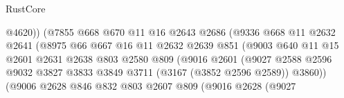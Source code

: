 \begin{lexlean}{RustCore}
\begin{coremodule}
                                        @4620))
                                    (@7855
                                      @668
                                      @670
                                      @11
                                      @16
                                      @2643
                                      @2686
                                      (@9336
                                        @668
                                        @11
                                        @2632
                                        @2641
                                        (@8975
                                          @66
                                          @667
                                          @16
                                          @11
                                          @2632
                                          @2639
                                          @851
                                          (@9003
                                            @640
                                            @11
                                            @15
                                            @2601
                                            @2631
                                            @2638
                                            @803
                                            @2580
                                            @809
                                            (@9016
                                              @2601
                                              (@9027
                                                @2588
                                                @2596
                                                @9032
                                                @3827
                                                @3833
                                                @3849
                                                @3711
                                                (@3167 (@3852 @2596 @2589))
                                                @3860))
                                            (@9006
                                              @2628
                                              @846
                                              @832
                                              @803
                                              @2607
                                              @809
                                              (@9016
                                                @2628
                                                (@9027

\end{coremodule}
\end{lexlean}
